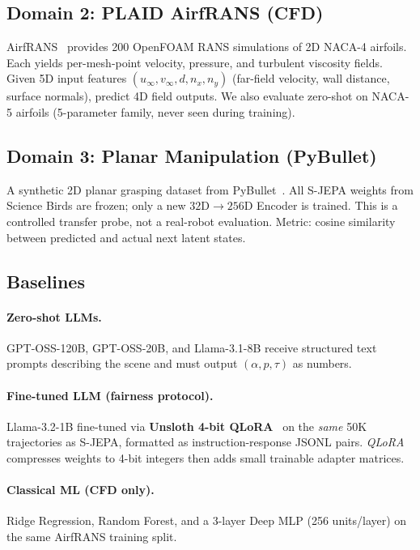 \documentclass[10pt,twocolumn]{article}
\begin{document}
\subsection{Domain 2: PLAID AirfRANS (CFD)}

AirfRANS~\citep{bonnet2022airfrans} provides 200 OpenFOAM RANS simulations of 2D
NACA-4 airfoils. Each yields per-mesh-point velocity, pressure, and turbulent viscosity
fields. Given 5D input features $(u_\infty, v_\infty, d, n_x, n_y)$ (far-field velocity,
wall distance, surface normals), predict 4D field outputs. We also evaluate zero-shot on
NACA-5 airfoils (5-parameter family, never seen during training).

\subsection{Domain 3: Planar Manipulation (PyBullet)}

A synthetic 2D planar grasping dataset from PyBullet~\citep{coumans2016pybullet}.
All S-JEPA weights from Science Birds are frozen; only a new $32\text{D}{\to}256\text{D}$
Encoder is trained. This is a controlled transfer probe, not a real-robot evaluation.
Metric: cosine similarity between predicted and actual next latent states.

\subsection{Baselines}

\paragraph{Zero-shot LLMs.}
GPT-OSS-120B, GPT-OSS-20B, and Llama-3.1-8B receive structured text prompts describing
the scene and must output $(\alpha, p, \tau)$ as numbers.

\paragraph{Fine-tuned LLM (fairness protocol).}
Llama-3.2-1B fine-tuned via \textbf{Unsloth 4-bit QLoRA}~\citep{dettmers2023qlora}
on the \emph{same} 50K trajectories as S-JEPA, formatted as instruction-response JSONL pairs.
\emph{QLoRA} compresses weights to 4-bit integers then adds small trainable adapter matrices.

\paragraph{Classical ML (CFD only).}
Ridge Regression, Random Forest, and a 3-layer Deep MLP (256 units/layer) on the same
AirfRANS training split.
\end{document}
